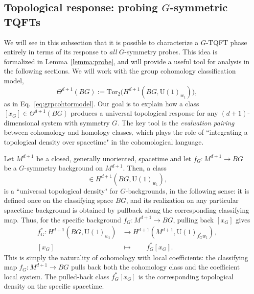 \documentclass[aps,prx,reprint,superscriptaddress,twocolumn,amsmath,amssymb,amsfonts, nofootinbib]{revtex4-2}
\newcommand{\U}{\text{U}}
\newcommand{\tor}{\text{Tor}}
\theoremstyle{apsstyle}
\begin{document}
\subsection{Topological response: probing $G$-symmetric TQFTs}
\label{sec:top_resp}
We will see in this subsection that it is possible to characterize a $G$-TQFT phase entirely in terms of its response to \textit{all} $G$-symmetry probes. This idea is formalized in Lemma~\ref{lemma:probe}, and will provide a useful tool for analysis in the following sections. We will work with the group cohomology classification model,
\begin{equation*}
    \Theta^{d+1}(BG) := \tor_{2}\bigl(H^{d+1}(BG,\U(1)_{w_{1}})\bigr),
\end{equation*}
as in Eq.~\ref{eq:grpcohtormodel}. Our goal is to explain how a class
$[x_{G}] \in \Theta^{d+1}(BG)$ produces a universal topological response for any $(d{+}1)$-dimensional system with symmetry $G$. The key tool is the \emph{evaluation pairing} between cohomology and homology classes, which plays the role of ``integrating a topological density over spacetime" in the cohomological language.

\bigskip

Let $M^{d+1}$ be a closed, generally unoriented, spacetime and let $f_G : M^{d+1} \to BG$ be a $G$-symmetry background on $M^{d+1}$. Then, a class 
\begin{equation*}
[x_{G}] \in H^{d+1}(BG,\U(1)_{w_{1}}),
\end{equation*}
is a ``universal topological density" for $G$-backgrounds, in the following sense: it is defined once on the classifying space $BG$, and its realization on any particular spacetime background is obtained by pullback along the corresponding classifying map. Thus, for the specific background $f_G:M^{d+1}\to BG$, pulling back $[x_G]$ gives
\begin{align*}
    f^{*}_{G}: H^{d+1}(BG,\U(1)_{w_{1}}) &\longrightarrow H^{d+1}(M^{d+1},\U(1)_{f^{*}_{G}w_{1}}),\\
     [x_{G}]\qquad  &\longmapsto \qquad f_{G}^{*}[x_{G}].
\end{align*}
This is simply the naturality of cohomology with local coefficients: the classifying map $f_G:M^{d+1}\to BG$ pulls back both the cohomology class and the coefficient local system. The pulled-back class $f_G^{*}[x_G]$ is the corresponding topological density on the specific spacetime.
 
\medskip 
\end{document}

